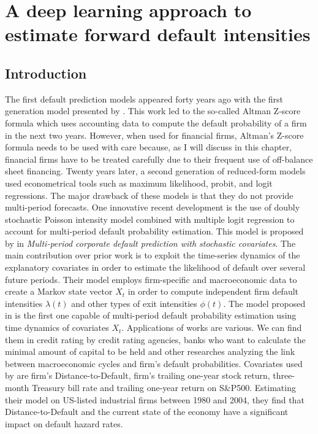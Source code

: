 \chapter{A deep learning approach to estimate forward default intensities}

\section{Introduction}
\label{S:1.1}
The first default prediction models appeared forty years ago with the first generation model presented by \citet{altman}. This work led to the so-called Altman Z-score formula which uses accounting data to compute the default probability of a firm in the next two years. However, when used for financial firms, Altman's Z-score formula needs to be used with care  because, as I will discuss in this chapter, financial firms have to be treated carefully due to their frequent use of off-balance sheet financing. Twenty years later, a second generation of reduced-form models used econometrical tools such as maximum likelihood, probit, and logit regressions. The major drawback of these models is that they do not provide multi-period forecasts. One innovative recent development is the use of doubly stochastic Poisson intensity model combined with multiple logit regression to account for multi-period default probability estimation. This model is proposed by \citet{DSW} in \textit{Multi-period corporate default prediction with stochastic covariates}. The main contribution over prior work is to exploit the time-series dynamics of the explanatory covariates in order to estimate the likelihood of default over several future periods. Their model employs firm-specific and macroeconomic data to create a Markov state vector $X_t$ in order to compute independent firm default intensities $\lambda(t)$ and other types of exit intensities $\phi(t)$.
The model proposed in \citet{DSW} is the first one capable of multi-period default probability estimation using time dynamics of covariates $X_t$. Applications of \citet{DSW} works are various. We can find them in credit rating by credit rating agencies, banks who want to calculate the minimal amount of capital to be held and other researches analyzing the link between macroeconomic cycles and firm's default probabilities. Covariates used by \citet{DSW} are firm's Distance-to-Default, firm's trailing one-year stock return, three-month Treasury bill rate and trailing one-year return on S\&P500. Estimating their model on US-listed industrial firms between 1980 and 2004, they find that Distance-to-Default and the current state of the economy have a significant impact on default hazard rates.

